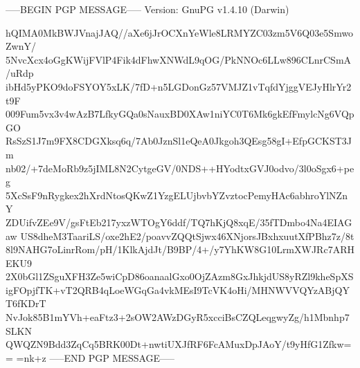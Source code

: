 -----BEGIN PGP MESSAGE-----
Version: GnuPG v1.4.10 (Darwin)

hQIMA0MkBWJVnajJAQ//aXe6jJrOCXnYeWle8LRMYZC03zm5V6Q03e5SmwoZwnY/
5NvcXcx4oGgKWijFVlP4Fik4dFhwXNWdL9qOG/PkNNOc6LLw896CLnrCSmA/uRdp
ibHd5yPKO9doFSYOY5xLK/7fD+n5LGDonGz57VMJZ1vTqfdYjggVEJyHlrYr2t9F
009Fum5vx3v4wAzB7LfkyGQa0sNauxBD0XAw1niYC0T6Mk6gkEfFmylcNg6VQpGO
RsSzS1J7m9FX8CDGXksq6q/7Ab0JznSl1eQeA0Jkgoh3QEsg58gI+EfpGCKST3Jm
nb02/+7deMoRb9z5jIML8N2CytgeGV/0NDS++HYodtxGVJ0odvo/3l0oSgx6+peg
5XcSsF9nRygkex2hXrdNtosQKwZ1YzgELUjbvbYZvztocPemyHAc6abhroYlNZnY
ZDUifvZEe9V/gsFtEb217yxzWTOgY6ddf/TQ7hKjQ8xqE/35fTDmbo4Na4EIAGaw
US8dheM3TaariLS/oxe2hE2/poavvZQQtSjwx46XNjorsJBxhxuutXfPBhz7z/8t
8l9NAHG7oLinrRom/pH/1KlkAjdJt/B9BP/4+/y7YhKW8G10LrmXWJRc7ARHEKU9
2X0bGl1ZSguXFH3Ze5wiCpD86oanaalGxo0OjZAzm8GxJhkjdUS8yRZl9kheSpXS
igFOpjfTK+vT2QRB4qLoeWGqGa4vkMEsI9TcVK4oHi/MHNWVVQYzABjQYT6fKDrT
NvJok85B1mYVh+eaFtz3+2sOW2AWzDGyR5xcciBsCZQLeqgwyZg/h1Mbnhp7SLKN
QWQZN9Bdd3ZqCq5BRK00Dt+nwtiUXJfRF6FcAMuxDpJAoY/t9yHfG1Zfkw==
=nk+z
-----END PGP MESSAGE-----
